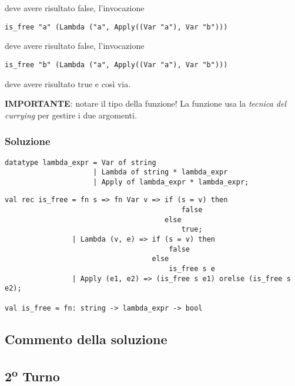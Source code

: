 deve avere risultato false, l'invocazione

\begin{lstlisting}[style = SML]
is_free "a" (Lambda ("a", Apply((Var "a"), Var "b")))
\end{lstlisting}

deve avere risultato false, l'invocazione

\begin{lstlisting}[style = SML]
is_free "b" (Lambda ("a", Apply((Var "a"), Var "b")))
\end{lstlisting}

deve avere risultato true e così via.

\medskip
\textbf{IMPORTANTE}: notare il tipo della funzione! La funzione usa la \emph{tecnica del currying} per gestire i due argomenti.

\subsubsection{Soluzione}

\begin{lstlisting}[style = SML, nolol = true, caption = {Definizione del tipo di dato \sml{espressione Lambda}}]
datatype lambda_expr = Var of string
					 | Lambda of string * lambda_expr
					 | Apply of lambda_expr * lambda_expr;
\end{lstlisting}

\begin{lstlisting}[style = SML, caption = {Definizione della funzione \sml{is\_free}}]
val rec is_free = fn s => fn Var v => if (s = v) then
									      false
									  else
									      true;
				| Lambda (v, e) => if (s = v) then
									   false
								   else
									   is_free s e
				| Apply (e1, e2) => (is_free s e1) orelse (is_free s e2);

val is_free = fn: string -> lambda_expr -> bool
\end{lstlisting}

\subsection{Commento della soluzione}

\omissis


\subsection{2\textsuperscript{o} Turno}

